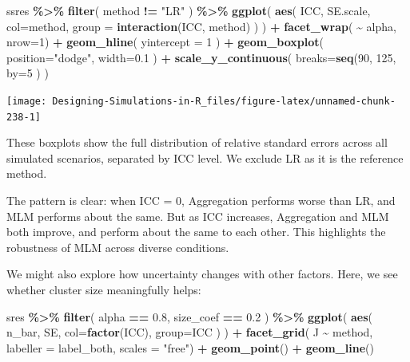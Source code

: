 \documentclass[
]{book}
\newenvironment{Shaded}{\begin{snugshade}}{\end{snugshade}}
\newcommand{\AttributeTok}[1]{\textcolor[rgb]{0.13,0.29,0.53}{#1}}
\newcommand{\DecValTok}[1]{\textcolor[rgb]{0.00,0.00,0.81}{#1}}
\newcommand{\FloatTok}[1]{\textcolor[rgb]{0.00,0.00,0.81}{#1}}
\newcommand{\FunctionTok}[1]{\textcolor[rgb]{0.13,0.29,0.53}{\textbf{#1}}}
\newcommand{\NormalTok}[1]{#1}
\newcommand{\SpecialCharTok}[1]{\textcolor[rgb]{0.81,0.36,0.00}{\textbf{#1}}}
\newcommand{\StringTok}[1]{\textcolor[rgb]{0.31,0.60,0.02}{#1}}
\begin{document}
\begin{Shaded}
\begin{Highlighting}[]
\NormalTok{ssres }\SpecialCharTok{\%\textgreater{}\%} 
  \FunctionTok{filter}\NormalTok{( method }\SpecialCharTok{!=} \StringTok{"LR"}\NormalTok{ ) }\SpecialCharTok{\%\textgreater{}\%}
  \FunctionTok{ggplot}\NormalTok{( }\FunctionTok{aes}\NormalTok{( ICC, SE.scale, }\AttributeTok{col=}\NormalTok{method, }
               \AttributeTok{group =} \FunctionTok{interaction}\NormalTok{(ICC, method) ) ) }\SpecialCharTok{+}
  \FunctionTok{facet\_wrap}\NormalTok{( }\SpecialCharTok{\textasciitilde{}}\NormalTok{ alpha, }\AttributeTok{nrow=}\DecValTok{1}\NormalTok{) }\SpecialCharTok{+}
  \FunctionTok{geom\_hline}\NormalTok{( }\AttributeTok{yintercept =} \DecValTok{1}\NormalTok{  ) }\SpecialCharTok{+}
  \FunctionTok{geom\_boxplot}\NormalTok{( }\AttributeTok{position=}\StringTok{"dodge"}\NormalTok{, }\AttributeTok{width=}\FloatTok{0.1}\NormalTok{ ) }\SpecialCharTok{+}
  \FunctionTok{scale\_y\_continuous}\NormalTok{( }\AttributeTok{breaks=}\FunctionTok{seq}\NormalTok{(}\DecValTok{90}\NormalTok{, }\DecValTok{125}\NormalTok{, }\AttributeTok{by=}\DecValTok{5}\NormalTok{ ) ) }
\end{Highlighting}
\end{Shaded}

\begin{center}\texttt{[image: Designing-Simulations-in-R\_files/figure-latex/unnamed-chunk-238-1]} \end{center}

These boxplots show the full distribution of relative standard errors across all simulated scenarios, separated by ICC level. We exclude LR as it is the reference method.

The pattern is clear: when ICC = 0, Aggregation performs worse than LR, and MLM performs about the same. But as ICC increases, Aggregation and MLM both improve, and perform about the same to each other.
This highlights the robustness of MLM across diverse conditions.

We might also explore how uncertainty changes with other factors.
Here, we see whether cluster size meaningfully helps:

\begin{Shaded}
\begin{Highlighting}[]
\NormalTok{sres }\SpecialCharTok{\%\textgreater{}\%}
  \FunctionTok{filter}\NormalTok{( alpha }\SpecialCharTok{==} \FloatTok{0.8}\NormalTok{, size\_coef }\SpecialCharTok{==} \FloatTok{0.2}\NormalTok{ ) }\SpecialCharTok{\%\textgreater{}\%}
\FunctionTok{ggplot}\NormalTok{( }\FunctionTok{aes}\NormalTok{( n\_bar, SE, }\AttributeTok{col=}\FunctionTok{factor}\NormalTok{(ICC), }\AttributeTok{group=}\NormalTok{ICC ) ) }\SpecialCharTok{+}
  \FunctionTok{facet\_grid}\NormalTok{( J }\SpecialCharTok{\textasciitilde{}}\NormalTok{ method, }\AttributeTok{labeller =}\NormalTok{ label\_both, }\AttributeTok{scales =} \StringTok{"free"}\NormalTok{) }\SpecialCharTok{+}
  \FunctionTok{geom\_point}\NormalTok{() }\SpecialCharTok{+} \FunctionTok{geom\_line}\NormalTok{()}
\end{Highlighting}
\end{Shaded}
\end{document}
